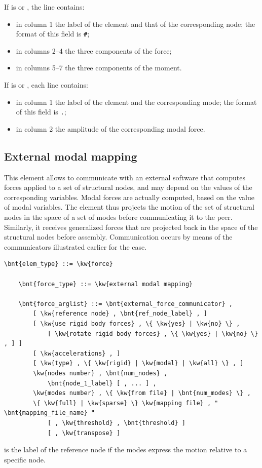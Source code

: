 If  is  or , the line contains:
\begin{itemize}
\item in column 1 the label of the element and that of the corresponding node;
	the format of this field is \texttt{\#};
\item in columns 2--4 the three components of the force;
\item in columns 5--7 the three components of the moment.
\end{itemize}
If  is  or , each line contains:
\begin{itemize}
\item in column 1 the label of the element and the corresponding mode;
	the format of this field is \texttt{.};
\item in column 2 the amplitude of the corresponding modal force.
\end{itemize}



\subsection{External modal mapping}
\label{sec:EL:FORCE:EXTERNAL:MODAL_MAPPING}
This element allows to communicate with an external software that computes
forces applied to a set of structural nodes,
and may depend on the values of the corresponding variables.
Modal forces are actually computed, based on the value of modal variables.
The element thus projects the motion of the set of structural nodes
in the space of a set of modes before communicating it to the peer.
Similarly, it receives generalized forces that are projected back
in the space of the structural nodes before assembly.
Communication occurs by means of the communicators illustrated earlier
for the  case.
\begin{Verbatim}[commandchars=\\\{\}]
    \bnt{elem_type} ::= \kw{force}

    \bnt{force_type} ::= \kw{external modal mapping}

    \bnt{force_arglist} ::= \bnt{external_force_communicator} ,
        [ \kw{reference node} , \bnt{ref_node_label} , ]
        [ \kw{use rigid body forces} , \{ \kw{yes} | \kw{no} \} ,
            [ \kw{rotate rigid body forces} , \{ \kw{yes} | \kw{no} \} , ] ]
        [ \kw{accelerations} , ]
        [ \kw{type} , \{ \kw{rigid} | \kw{modal} | \kw{all} \} , ]
        \kw{nodes number} , \bnt{num_nodes} ,
            \bnt{node_1_label} [ , ... ] ,
        \kw{modes number} , \{ \kw{from file} | \bnt{num_modes} \} ,
        \{ \kw{full} | \kw{sparse} \} \kw{mapping file} , " \bnt{mapping_file_name} "
            [ , \kw{threshold} , \bnt{threshold} ]
            [ , \kw{transpose} ]
\end{Verbatim}
 is the label of the reference node
if the modes express the motion relative to a specific node.

